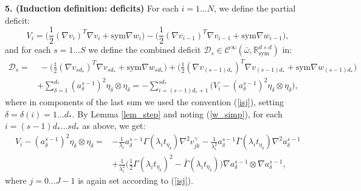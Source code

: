 \documentclass[reqno,twoside,11pt]{amsart}
\newcommand{\sym}{\mathrm{sym}}
\newcommand{\R}{\mathbb{R}}
\numberwithin{equation}{section}
\theoremstyle{plain}
\theoremstyle{definition}
\begin{document}
{\bf 5. (Induction definition: deficits)} For each $i=1\ldots N$, we define the partial deficit:
$$ V_i = \big(\frac{1}{2}(\nabla v_i)^T\nabla v_i+\sym\nabla
w_i\big) - \big(\frac{1}{2}(\nabla v_{i-1})^T\nabla v_{i-1}+\sym\nabla w_{i-1}\big),$$
and for each $s=1\ldots S$ we define the combined deficit
$\mathcal{D}_s\in\mathcal{C}^\infty(\bar\omega, \R^{d\times d}_\sym)$ in:
\begin{equation*}
\begin{split}
\mathcal{D}_s  = & \; -\big(\frac{1}{2}(\nabla v_{sd_*})^T\nabla v_{sd_*}+\sym\nabla
w_{sd_*}\big) + \big(\frac{1}{2}(\nabla v_{(s-1)d_*})^T\nabla v_{(s-1)d_*}+\sym\nabla w_{(s-1)d_*}\big)
\\ & +\sum_{\delta=1}^{d_*}(a_\delta^{s-1})^2\eta_\delta\otimes\eta_\delta
= - \sum_{i=(s-1)d_*+1}^{sd_*} \Big(V_i - (a_\delta^{s-1})^2\eta_\delta\otimes \eta_\delta\Big),
\end{split}
\end{equation*}
where in components of the last sum we used the convention (\ref{isj}), setting $\delta=\delta(i)=1\ldots d_*$.
By Lemma \ref{lem_step} and noting (\ref{w_simp}), for each $i=(s-1)d_* \ldots {sd_*}$ as above, we get:
\begin{equation}\label{prep_defi_s}
\begin{split}
V_i - (a_\delta^{s-1})^2\eta_\delta\otimes \eta_\delta
 = & - \frac{1}{\lambda_i} a_\delta^{s-1} \Gamma(\lambda_i t_{\eta_\delta})\nabla^2 v_{jk}^\gamma
- \frac{1}{\lambda_i^2}a^{s-1}_\delta \bar\Gamma(\lambda_i t_{\eta_\delta})\nabla^2a^{s-1}_\delta
\\ & + \frac{1}{\lambda_i^2}\big(\frac{1}{2}\Gamma(\lambda_i
t_{\eta_\delta})^2-\bar\Gamma(\lambda_i t_{\eta_\delta})\big) \nabla a^{s-1}_\delta\otimes\nabla a^{s-1}_\delta,
\end{split}
\end{equation}
where $j=0\ldots J-1$ is again set according to (\ref{isj}).

\medskip
\end{document}
